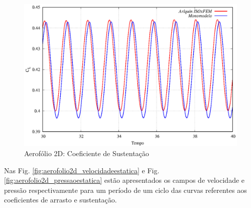 \documentclass[tese_patricia]{subfiles}
\begin{document}
\begin{figure}[htb!]
	\centering 
	\includegraphics[scale=1.0,trim=0cm 0cm 0cm 0cm, clip=true]{Imagens/Cap6/LiftRe.eps}	
	\caption{Aerofólio 2D: Coeficiente de Sustentação}
	\label{fig:aerofolio2d_aeroLift}
\end{figure}

Nas Fig. \ref{fig:aerofolio2d_velocidadeestatica} e Fig. \ref{fig:aerofolio2d_pressaoestatica} estão apresentados os campos de velocidade e pressão respectivamente para um período de um ciclo das curvas referentes aos coeficientes de arrasto e sustentação. 
\end{document}
